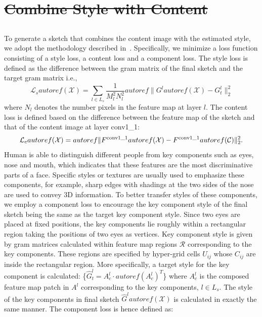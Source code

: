\documentclass[10pt,twocolumn,letterpaper]{article}
\providecommand{\DIFaddtex}[1]{{\protect\color{blue}\uwave{#1}}} %
\providecommand{\DIFdeltex}[1]{{\protect\color{red}\sout{#1}}}                      %
\providecommand{\DIFaddbegin}{} %
\providecommand{\DIFaddend}{} %
\providecommand{\DIFdelbegin}{} %
\providecommand{\DIFdelend}{} %
\providecommand{\DIFadd}[1]{\texorpdfstring{\DIFaddtex{#1}}{#1}} %
\providecommand{\DIFdel}[1]{\texorpdfstring{\DIFdeltex{#1}}{}} %
\begin{document}
{
\DIFdelbegin \section{\DIFdel{Combine Style with Content}}
\addtocounter{section}{-1}%
\DIFdelend \DIFaddbegin \subsection{\DIFadd{Loss Function}}
\DIFaddend }
To generate a sketch that combines the content image with the estimated style, we adopt the methodology described in~\cite{gatys2015texture}. Specifically, we minimize a loss function consisting of a style loss, a content loss and a component loss. The style loss is defined as the difference between the gram matrix of the final sketch and the target gram matrix i.e.,
\begin{equation}
\mathcal{L}_{s} autoref( \mathcal{X} ) = \sum\limits_{l \in {L_s}} {\frac{1}{{M_l^2N_l^2}}autoref\| {{G^l}autoref( \mathcal{X} ) - G_t^l} \|_2^2} 
\label{eq:Gram_loss}
\end{equation}
where $N_l$ denotes the number pixels in the feature map at layer $l$. The content loss is defined based on the difference between the feature map of the sketch and that of the content image at layer conv1\_1:
\begin{equation}
\mathcal{L}_{c}autoref( \mathcal{X} ) = autoref\| {{F^{\rm{conv1\_1}}}autoref( \mathcal{X} ) - {F^{\rm{conv1\_1}}}autoref( \mathcal{C} )} \|_2^2.
\label{eq:Style_loss}
\end{equation}
Human is able to distinguish different people from key components such as eyes, nose and mouth, which indicates that these features are the most discriminative parts of a face. Specific styles or textures are usually used to emphasize these components, for example, sharp edges with shadings at the two sides of the nose are used to convey 3D information. To better transfer styles of these components, we employ a component loss to encourage the key component style of the final sketch being the same as the target key component style. Since two eyes are placed at fixed positions, the key components lie roughly within a rectangular region taking the positions of two eyes as vertices. Key component style is given by gram matrices calculated within feature map regions $\mathcal R$ corresponding to the key components. These regions are specified by hyper-grid cells $U_{ij}$ whose $C_{ij}$ are inside the rectangular region. More specifically, a target style for the key component is calculated: \{${\hat G}_{t}^l ={A}_{c}^l \cdot {autoref( {{{A}_{c}^l}} )^T}$\} where ${A}_{c}^l$ is the composed feature map patch in $A^{l}$ corresponding to the key components, $l\in L_s$. The style of the key components in final sketch ${\hat G}^lautoref( \mathcal{X} ) $ is calculated in exactly the same manner. The component loss is hence defined as:
\end{document}
